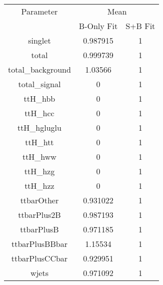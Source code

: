 \begin{table}
\centering
\begin{tabular}{ccc}
\toprule
Parameter & \multicolumn{2}{c}{Mean}\\
 & B-Only Fit & S+B Fit\\
\midrule
singlet & \num{0.987915} & \num{1}\\
total & \num{0.999739} & \num{1}\\
total\_background & \num{1.03566} & \num{1}\\
total\_signal & \num{0} & \num{1}\\
ttH\_hbb & \num{0} & \num{1}\\
ttH\_hcc & \num{0} & \num{1}\\
ttH\_hgluglu & \num{0} & \num{1}\\
ttH\_htt & \num{0} & \num{1}\\
ttH\_hww & \num{0} & \num{1}\\
ttH\_hzg & \num{0} & \num{1}\\
ttH\_hzz & \num{0} & \num{1}\\
ttbarOther & \num{0.931022} & \num{1}\\
ttbarPlus2B & \num{0.987193} & \num{1}\\
ttbarPlusB & \num{0.971185} & \num{1}\\
ttbarPlusBBbar & \num{1.15534} & \num{1}\\
ttbarPlusCCbar & \num{0.929951} & \num{1}\\
wjets & \num{0.971092} & \num{1}\\
\bottomrule
\end{tabular}
\end{table}